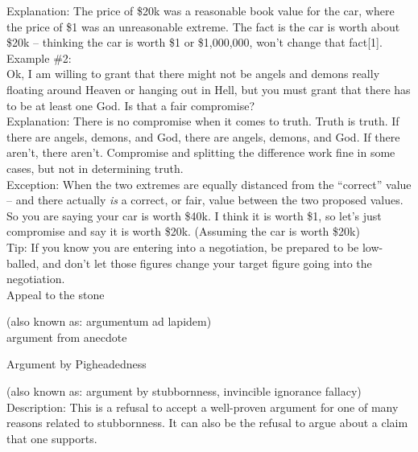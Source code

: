 \documentclass[a4paper,12pt,single,pdftex]{scrartcl}
\begin{document}
    
      Explanation: The price of \$20k was a reasonable book value for the car, where the price of \$1 was an unreasonable extreme.  The fact is the car is worth about \$20k -- thinking the car is worth \$1 or \$1,000,000, won’t change that fact[1].
    \\

    
      Example \#2:
    \\

    
      Ok, I am willing to grant that there might not be angels and demons really floating around Heaven or hanging out in Hell, but you must grant that there has to be at least one God.  Is that a fair compromise?
    \\

    
      Explanation: There is no compromise when it comes to truth.  Truth is truth.  If there are angels, demons, and God, there are angels, demons, and God.  If there aren’t, there aren’t.  Compromise and splitting the difference work fine in some cases, but not in determining truth.
    \\

    
      Exception: When the two extremes are equally distanced from the “correct” value -- and there actually {\it is} a correct, or fair, value between the two proposed values.
    \\

    
      So you are saying your car is worth \$40k.  I think it is worth \$1, so let’s just compromise and say it is worth \$20k. (Assuming the car is worth \$20k)
    \\

    
      Tip: If you know you are entering into a negotiation, be prepared to be low-balled, and don’t let those figures change your target figure going into the negotiation. 
    \\

  

Appeal to the stone
    
      (also known as: argumentum ad lapidem)
    \\

  

argument from anecdote

Argument by Pigheadedness
    
      (also known as: argument by stubbornness, invincible ignorance fallacy)
    \\

  
    Description: This is a refusal to accept a well-proven argument for one of many reasons related to stubbornness. It can also be the refusal to argue about a claim that one supports.
\end{document}
